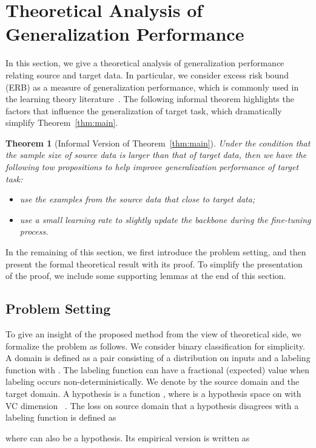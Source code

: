 \documentclass[10pt,twocolumn,letterpaper]{article}
\newtheorem{thm}{Theorem}
\begin{document}
\section{Theoretical Analysis of Generalization Performance} In this section, we give a theoretical analysis of generalization performance relating source and target data. In particular, we consider excess risk bound (ERB) as a measure of generalization performance, which is commonly used in the learning theory literature~\cite{vapnik2013nature}. The following informal theorem highlights the factors that influence the generalization of target task, which dramatically simplify Theorem~\ref{thm:main}.
\begin{thm}[Informal Version of Theorem~\ref{thm:main}]\label{thm:main:informal} 
Under the condition that the sample size of source data is larger than that of target data, then we have the following tow propositions to help improve generalization performance of target task:
\begin{itemize}
    \item use the examples from the source data that close to target data;
    \item use a small learning rate to slightly update the backbone during the fine-tuning process.
\end{itemize}
\end{thm}
In the remaining of this section, we first introduce the problem setting, and then present the formal theoretical result with its proof. To simplify the presentation of the proof, we include some supporting lemmas at the end of this section.
\subsection{Problem Setting}
To give an insight of the proposed method from the view of theoretical side, we formalize the problem as follows. We consider binary classification for simplicity. A domain is defined as a pair consisting of a distribution  on inputs  and a labeling function  with . The labeling function can have a fractional (expected) value when labeling occurs non-deterministically. We denote by  the source domain and  the target domain. A hypothesis is a function , where  is a hypothesis space on  with VC dimension~\cite{vapnik1971uniform} . The loss on source domain that a hypothesis  disagrees with a labeling function  is defined as

where  can also be a hypothesis. Its empirical version is written as
\end{document}
